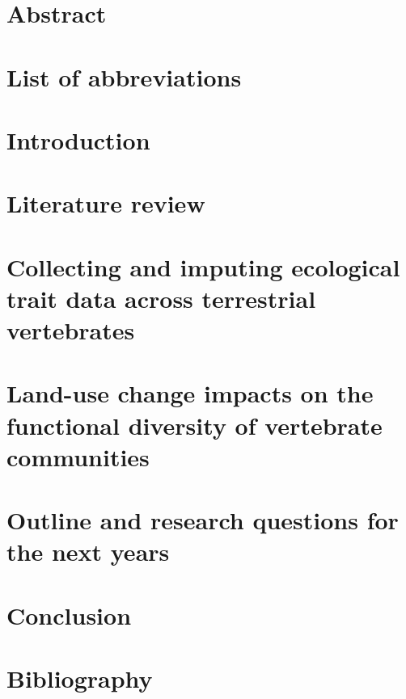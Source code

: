 \documentclass[11pt]{report}
\begin{document}




\chapter*{Abstract}


\clearpage
\tableofcontents


\clearpage
\listoftables

\listoffigures



\chapter*{List of abbreviations}


\clearpage
\chapter{Introduction}
%

\chapter{Literature review}
%

\pagebreak
\chapter{Collecting and imputing ecological trait data across terrestrial vertebrates}


\chapter{Land-use change impacts on the functional diversity of vertebrate communities}


\chapter{Outline and research questions for the next years}

\chapter{Conclusion}

\clearpage
\chapter*{Bibliography}
\printbibliography[heading=none]
\end{document}

